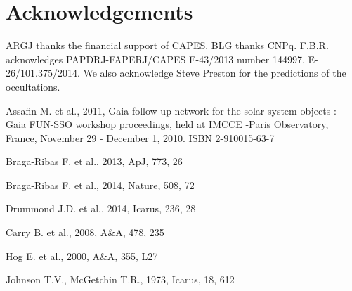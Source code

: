 \documentclass[useAMS,usenatbib]{mn2e}
\begin{document}
\section*{Acknowledgements}

ARGJ thanks the financial support of CAPES. BLG thanks CNPq. F.B.R. acknowledges PAPDRJ-FAPERJ/CAPES E-43/2013 number 144997, E-26/101.375/2014. We also acknowledge Steve Preston for the predictions of the occultations.


\begin{thebibliography}{99}

 Assafin M. et al., 2011, Gaia follow-up network for the solar system objects : Gaia FUN-SSO workshop proceedings, held at IMCCE -Paris Observatory, France, November 29 - December 1, 2010. ISBN 2-910015-63-7


 Braga-Ribas F. et al., 2013,
ApJ, 773, 26

 Braga-Ribas F. et al., 2014,
Nature, 508, 72

 Drummond J.D. et al., 2014,
Icarus, 236, 28

 Carry B. et al., 2008,
A\&A, 478, 235

 Hog E. et al., 2000,
A\&A, 355, L27

 Johnson T.V., McGetchin T.R., 1973,
Icarus, 18, 612


\end{thebibliography}
\end{document}
